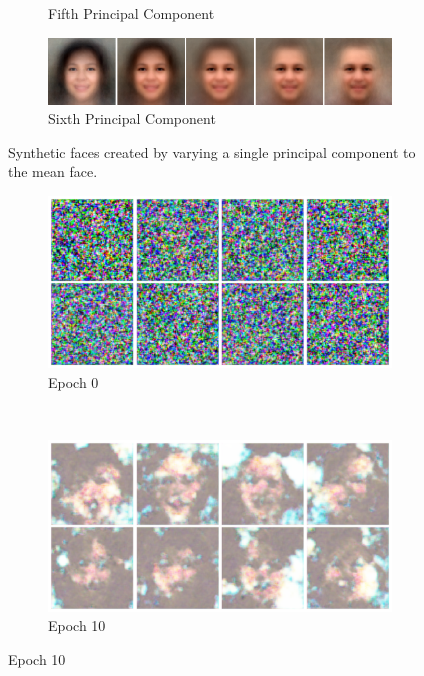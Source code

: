 \begin{figure}
\begin{subfigure}[b]{\textwidth}
        \caption{Fifth Principal Component}
    \end{subfigure}
    \begin{subfigure}[b]{\textwidth}
        \includegraphics[width=\textwidth]{fig/PCA/pca5}
        \caption{Sixth Principal Component}
    \end{subfigure}
    \caption{Synthetic faces created by varying a single principal component to the mean face.}
    \label{pca-components}
\end{figure}

\begin{figure}
    \centering
    \begin{subfigure}[b]{0.45\textwidth}
        \includegraphics[width=\textwidth]{fig/dcgan/ffhq/epoch0}
        \caption{Epoch 0}
    \end{subfigure}
    ~
    \begin{subfigure}[b]{0.45\textwidth}
        \includegraphics[width=\textwidth]{fig/dcgan/ffhq/epoch200}
        \caption{Epoch 10}
    \end{subfigure}


\end{figure}
